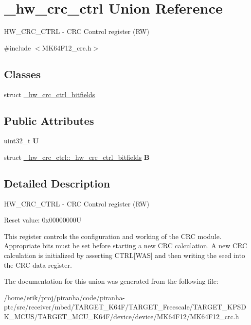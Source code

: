 \hypertarget{union__hw__crc__ctrl}{}\section{\+\_\+hw\+\_\+crc\+\_\+ctrl Union Reference}
\label{union__hw__crc__ctrl}


H\+W\+\_\+\+C\+R\+C\+\_\+\+C\+T\+RL -\/ C\+RC Control register (RW)  




{\ttfamily \#include $<$M\+K64\+F12\+\_\+crc.\+h$>$}

\subsection*{Classes}
\begin{DoxyCompactItemize}
\item 
struct \hyperlink{struct__hw__crc__ctrl_1_1__hw__crc__ctrl__bitfields}{\+\_\+hw\+\_\+crc\+\_\+ctrl\+\_\+bitfields}
\end{DoxyCompactItemize}
\subsection*{Public Attributes}
\begin{DoxyCompactItemize}
\item 
uint32\+\_\+t {\bfseries U}\hypertarget{union__hw__crc__ctrl_afff8843dadaff446b6043ebf6d84bf29}{}\label{union__hw__crc__ctrl_afff8843dadaff446b6043ebf6d84bf29}

\item 
struct \hyperlink{struct__hw__crc__ctrl_1_1__hw__crc__ctrl__bitfields}{\+\_\+hw\+\_\+crc\+\_\+ctrl\+::\+\_\+hw\+\_\+crc\+\_\+ctrl\+\_\+bitfields} {\bfseries B}\hypertarget{union__hw__crc__ctrl_add9fdbd52986360e12cfa43305f7b0f4}{}\label{union__hw__crc__ctrl_add9fdbd52986360e12cfa43305f7b0f4}

\end{DoxyCompactItemize}


\subsection{Detailed Description}
H\+W\+\_\+\+C\+R\+C\+\_\+\+C\+T\+RL -\/ C\+RC Control register (RW) 

Reset value\+: 0x00000000U

This register controls the configuration and working of the C\+RC module. Appropriate bits must be set before starting a new C\+RC calculation. A new C\+RC calculation is initialized by asserting C\+T\+RL\mbox{[}W\+AS\mbox{]} and then writing the seed into the C\+RC data register. 

The documentation for this union was generated from the following file\+:\begin{DoxyCompactItemize}
\item 
/home/erik/proj/piranha/code/piranha-\/ptc/src/receiver/mbed/\+T\+A\+R\+G\+E\+T\+\_\+\+K64\+F/\+T\+A\+R\+G\+E\+T\+\_\+\+Freescale/\+T\+A\+R\+G\+E\+T\+\_\+\+K\+P\+S\+D\+K\+\_\+\+M\+C\+U\+S/\+T\+A\+R\+G\+E\+T\+\_\+\+M\+C\+U\+\_\+\+K64\+F/device/device/\+M\+K64\+F12/M\+K64\+F12\+\_\+crc.\+h\end{DoxyCompactItemize}
